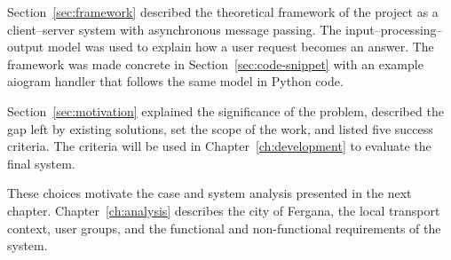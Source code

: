 Section~\ref{sec:framework} described the theoretical framework of the
project as a client--server system with asynchronous message passing.
The input--processing--output model was used to explain how a user
request becomes an answer. The framework was made concrete in
Section~\ref{sec:code-snippet} with an example aiogram handler that
follows the same model in Python code.

Section~\ref{sec:motivation} explained the significance of the problem,
described the gap left by existing solutions, set the scope of the
work, and listed five success criteria. The criteria will be used in
Chapter~\ref{ch:development} to evaluate the final system.

These choices motivate the case and system analysis presented in the
next chapter. Chapter~\ref{ch:analysis} describes the city of Fergana,
the local transport context, user groups, and the functional and
non-functional requirements of the system.